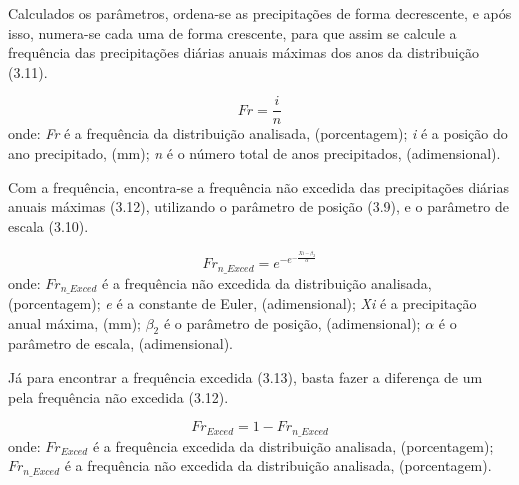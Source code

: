 Calculados os parâmetros, ordena-se as precipitações de forma decrescente, e após isso, numera-se cada uma de forma crescente, para que assim se calcule a frequência das precipitações diárias anuais máximas dos anos da distribuição (3.11).\bigskip

\begin{equation}
Fr = \frac{i}{n}
\end{equation}
\newline
onde:
\newline
\textit{Fr} é a frequência da distribuição analisada, (porcentagem);
\newline
\textit{i} é a posição do ano precipitado, (mm);
\newline
\textit{n} é o número total de anos precipitados, (adimensional).\bigskip

Com a frequência, encontra-se a frequência não excedida das precipitações diárias anuais máximas (3.12), utilizando o parâmetro de posição (3.9), e o parâmetro de escala (3.10).\bigskip

\begin{equation}
Fr_{n\_Exced} = e^{- e^{- \frac{Xi - \beta_2}{\alpha}}}
\end{equation}
\newline
onde:
\newline
$Fr_{n\_Exced}$ é a frequência não excedida da distribuição analisada, (porcentagem);
\newline
\textit{e} é a constante de Euler, (adimensional);
\newline
\textit{Xi} é a precipitação anual máxima, (mm);
\newline
$\beta_2$ é o parâmetro de posição, (adimensional);
\newline
$\alpha$ é o parâmetro de escala, (adimensional).\bigskip

Já para encontrar a frequência excedida (3.13), basta fazer a diferença de um pela frequência não excedida (3.12).

\begin{equation}
Fr_{Exced} = 1 - Fr_{n\_Exced}
\end{equation}
\newline
onde:
\newline
$Fr_{Exced}$ é a frequência excedida da distribuição analisada, (porcentagem);
\newline
$Fr_{n\_Exced}$ é a frequência não excedida da distribuição analisada, (porcentagem).\bigskip

